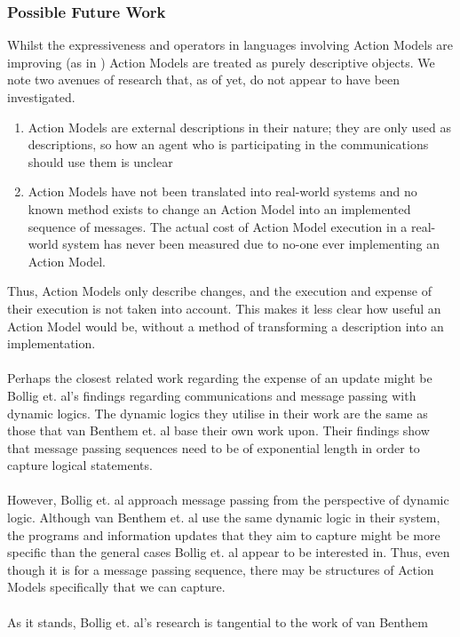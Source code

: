 \documentclass[12pt, a4paper, titlepage]{scrartcl}
\begin{document}
\subsubsection{Possible Future Work}
Whilst the expressiveness and operators in languages involving Action Models are
improving (as in \citep{benthem2006lcc}) Action Models are treated as purely
descriptive objects.
We note two avenues of research that, as of yet, do not appear to have been
investigated.
\begin{enumerate}
	\item Action Models are external descriptions in their nature; they are only used as
	descriptions, so how an agent who is participating in the communications
	should use them is unclear
	\item Action Models have not been translated into real-world systems and no
	known method exists to change an Action Model into an implemented sequence of
	messages. The actual cost of Action Model execution in a real-world system has
	never been measured due to no-one ever implementing an Action Model.
\end{enumerate}
Thus, Action Models only describe changes, and the execution and expense of
their execution is not taken into account.
This makes it less clear how useful an Action Model would be, without a method
of transforming a description into an implementation.\\
\\
Perhaps the closest related work regarding the expense of an update might be
Bollig et. al's findings regarding communications and message passing with
dynamic logics.
The dynamic logics they utilise in their work are the same as those that van
Benthem et. al base their own work upon.
Their findings show that message passing sequences need to be of exponential
length in order to capture logical statements. \citep{bollig07mps}\\
\\
However, Bollig et. al approach message passing from the perspective of dynamic
logic.
Although van Benthem et. al use the same dynamic logic in their system, the
programs and information updates that they aim to capture might be more specific
than the general cases Bollig et. al appear to be interested in.
Thus, even though it is for a message passing sequence, there may be
structures of Action Models specifically that we can capture.\\
\\
As it stands, Bollig et. al's research is tangential to the work of van Benthem
\end{document}

